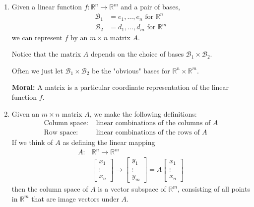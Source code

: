 \begin{enumerate}
\item Given a linear function $f: \mathbb{R}^n \rightarrow \mathbb{R}^m$ and a pair of bases,
    \begin{align*}
        \mathcal{B}_1 &= {e_1,\dots, e_n}\text{ for }\mathbb{R}^n \\
        \mathcal{B}_2 &= {d_1,\dots, d_m}\text{ for }\mathbb{R}^m
    \end{align*}
    we can represent $f$ by an $m\times n$ matrix $A$.

    Notice that the matrix $A$ depends on the choice of bases $\mathcal{B}_1 \times \mathcal{B}_2$.
    
    Often we just let $\mathcal{B}_1 \times \mathcal{B}_2$ be the "obvious" bases for $\mathbb{R}^n \times \mathbb{R}^m$.
    
    \textbf{Moral:} A matrix is a particular coordinate representation of the linear function $f$.
    
\item Given an $m \times n$ matrix $A$, we make the following definitions:
    \begin{align*}
        \text{Column space: } & \text{linear combinations of the columns of }A\\
        \text{Row space: } & \text{linear combinations of the rows of }A
    \end{align*}
    If we think of $A$ as defining the linear mapping 
    \begin{align*}
        A: &\mathbb{R}^n \rightarrow \mathbb{R}^m \\
        &
        \begin{bmatrix} x_1 \\ \vdots \\ x_n \end{bmatrix}
        \rightarrow
        \begin{bmatrix} y_1 \\ \vdots \\ y_m \end{bmatrix}
        =
        A
        \begin{bmatrix} x_1 \\ \vdots \\ x_n \end{bmatrix}
    \end{align*}
    then the column space of $A$ is a vector subspace of $\mathbb{R}^m$, consisting of all points in $\mathbb{R}^m$ that are image vectors under $A$.
    

\end{enumerate}
